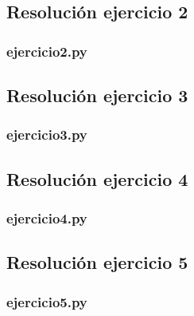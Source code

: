 \documentclass[11pt,a4paper]{article}
\begin{document}
	\newpage

	\subsection{Resolución ejercicio 2}\label{ejercicio_2}
		\subsubsection{ejercicio2.py}

	\newpage

	\subsection{Resolución ejercicio 3}\label{ejercicio_3}
		\subsubsection{ejercicio3.py}

	\newpage

	\subsection{Resolución ejercicio 4}\label{ejercicio_4}
		\subsubsection{ejercicio4.py}

	\newpage

	\subsection{Resolución ejercicio 5}\label{ejercicio_5}
		\subsubsection{ejercicio5.py}
			
\end{document}
